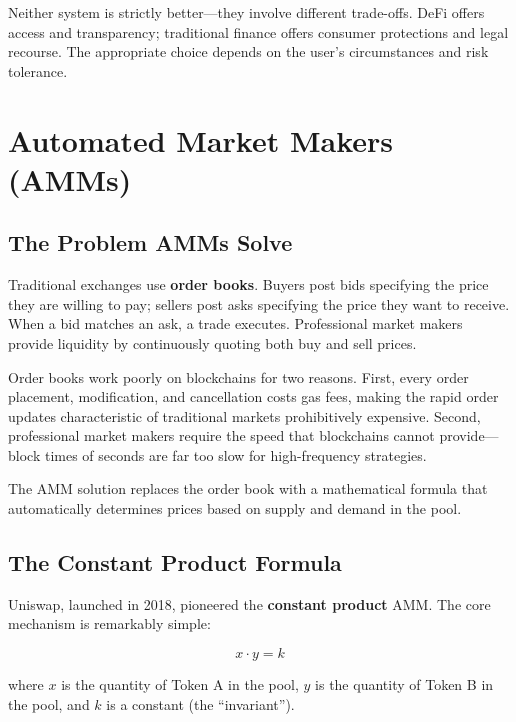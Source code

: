 \documentclass[11pt,a4paper]{article}
\newcommand{\keyword}[1]{\textbf{\textcolor{AccentOrange}{#1}}}
\begin{document}
Neither system is strictly better---they involve different trade-offs. DeFi offers access and transparency; traditional finance offers consumer protections and legal recourse. The appropriate choice depends on the user's circumstances and risk tolerance.

\section{Automated Market Makers (AMMs)}

\subsection{The Problem AMMs Solve}

Traditional exchanges use \keyword{order books}. Buyers post bids specifying the price they are willing to pay; sellers post asks specifying the price they want to receive. When a bid matches an ask, a trade executes. Professional market makers provide liquidity by continuously quoting both buy and sell prices.

Order books work poorly on blockchains for two reasons. First, every order placement, modification, and cancellation costs gas fees, making the rapid order updates characteristic of traditional markets prohibitively expensive. Second, professional market makers require the speed that blockchains cannot provide---block times of seconds are far too slow for high-frequency strategies.

The AMM solution replaces the order book with a mathematical formula that automatically determines prices based on supply and demand in the pool.

\subsection{The Constant Product Formula}

Uniswap, launched in 2018, pioneered the \keyword{constant product} AMM. The core mechanism is remarkably simple:

\begin{equation}
x \cdot y = k
\end{equation}

where $x$ is the quantity of Token A in the pool, $y$ is the quantity of Token B in the pool, and $k$ is a constant (the ``invariant'').
\end{document}
